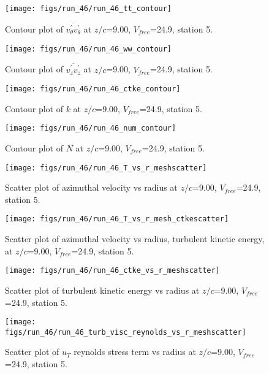 \begin{figure}[H]
\centering
\texttt{[image: figs/run\_46/run\_46\_tt\_contour]}
\caption{Contour plot of $\overline{v_{\theta}^{\prime} v_{\theta}^{\prime}}$ at $z/c$=9.00, $V_{free}$=24.9, station 5.}
\end{figure}


\begin{figure}[H]
\centering
\texttt{[image: figs/run\_46/run\_46\_ww\_contour]}
\caption{Contour plot of $\overline{v_{z}^{\prime} v_{z}^{\prime}}$ at $z/c$=9.00, $V_{free}$=24.9, station 5.}
\end{figure}


\begin{figure}[H]
\centering
\texttt{[image: figs/run\_46/run\_46\_ctke\_contour]}
\caption{Contour plot of $k$ at $z/c$=9.00, $V_{free}$=24.9, station 5.}
\end{figure}


\begin{figure}[H]
\centering
\texttt{[image: figs/run\_46/run\_46\_num\_contour]}
\caption{Contour plot of $N$ at $z/c$=9.00, $V_{free}$=24.9, station 5.}
\end{figure}


\begin{figure}[H]
\centering
\texttt{[image: figs/run\_46/run\_46\_T\_vs\_r\_meshscatter]}
\caption{Scatter plot of azimuthal velocity vs radius at $z/c$=9.00, $V_{free}$=24.9, station 5.}
\end{figure}


\begin{figure}[H]
\centering
\texttt{[image: figs/run\_46/run\_46\_T\_vs\_r\_mesh\_ctkescatter]}
\caption{Scatter plot of azimuthal velocity vs radius, turbulent kinetic energy, at $z/c$=9.00, $V_{free}$=24.9, station 5.}
\end{figure}


\begin{figure}[H]
\centering
\texttt{[image: figs/run\_46/run\_46\_ctke\_vs\_r\_meshscatter]}
\caption{Scatter plot of turbulent kinetic energy vs radius at $z/c$=9.00, $V_{free}$=24.9, station 5.}
\end{figure}


\begin{figure}[H]
\centering
\texttt{[image: figs/run\_46/run\_46\_turb\_visc\_reynolds\_vs\_r\_meshscatter]}
\caption{Scatter plot of $
u_T$ reynolds stress term vs radius at $z/c$=9.00, $V_{free}$=24.9, station 5.}
\end{figure}


